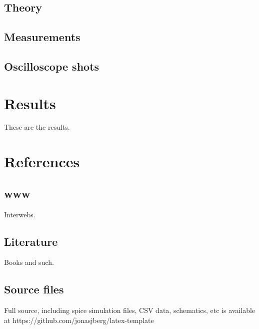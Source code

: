 \documentclass[11pt,a4paper]{article}
\begin{document}
\subsection{Theory}\label{non-inverting-dc-amplifier-theory}

\subsection{Measurements}\label{measurements-2}

\subsection{Oscilloscope shots}\label{noninvAC-oscilloscope-shots}


\section{Results}\label{setup}
These are the results.

\newpage

\section{References}\label{references}

\subsection{www}\label{literature}
Interwebs.

\subsection{Literature}\label{literature}
Books and such.

\subsection{Source files}\label{sources}
Full source, including spice simulation files, CSV data, schematics, etc
is available at https://github.com/jonasjberg/latex-template


\end{document}
